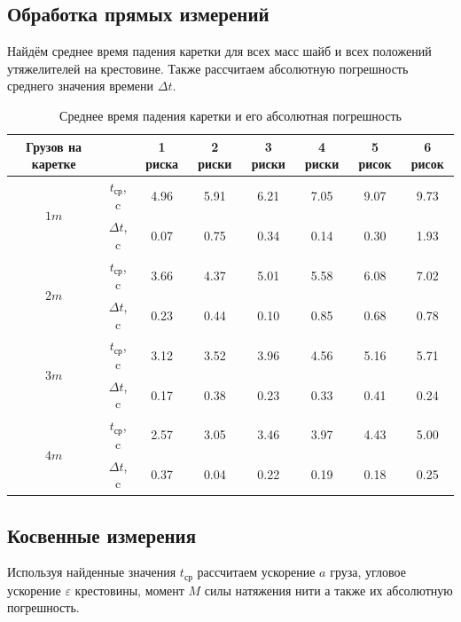 \documentclass[12pt, a4paper]{article}
\begin{document}
\subsection{Обработка прямых измерений}
Найдём среднее время падения каретки для всех масс шайб и всех положений утяжелителей на крестовине. Также рассчитаем абсолютную погрешность среднего значения времени $\Delta t$.
\begin{table}[!h]
\begin{center}
\begin{tabular}{|c|c|c|c|c|c|c|c|}
\hline
Грузов на каретке & & 1 риска & 2 риски & 3 риски & 4 риски & 5 рисок & 6 рисок \\
\hline
\multirow{2}{*}{$1 m $} & $t_{\text{ср}}$, c &4.96 & 5.91 & 6.21 & 7.05 & 9.07 & 9.73\\ 
&$\Delta t$, c &0.07 & 0.75 & 0.34 & 0.14 & 0.30 & 1.93\\ 
\hline 
\multirow{2}{*}{$2 m $} & $t_{\text{ср}}$, c &3.66 & 4.37 & 5.01 & 5.58 & 6.08 & 7.02\\ 
&$\Delta t$, c &0.23 & 0.44 & 0.10 & 0.85 & 0.68 & 0.78\\ 
\hline 
\multirow{2}{*}{$3 m $} & $t_{\text{ср}}$, c &3.12 & 3.52 & 3.96 & 4.56 & 5.16 & 5.71\\ 
&$\Delta t$, c &0.17 & 0.38 & 0.23 & 0.33 & 0.41 & 0.24\\ 
\hline 
\multirow{2}{*}{$4 m $} & $t_{\text{ср}}$, c &2.57 & 3.05 & 3.46 & 3.97 & 4.43 & 5.00\\ 
&$\Delta t$, c &0.37 & 0.04 & 0.22 & 0.19 & 0.18 & 0.25\\ 
\hline 

\end{tabular}
\caption{Среднее время падения каретки и его абсолютная погрешность}
\end{center}
\label{tab:2}
\end{table}

\subsection{Косвенные измерения}
Используя найденные значения $t_\text{ср}$ рассчитаем ускорение $a$ груза, угловое ускорение $\varepsilon$ крестовины, момент $M$ силы натяжения
нити а также их абсолютную погрешность.
\end{document}
